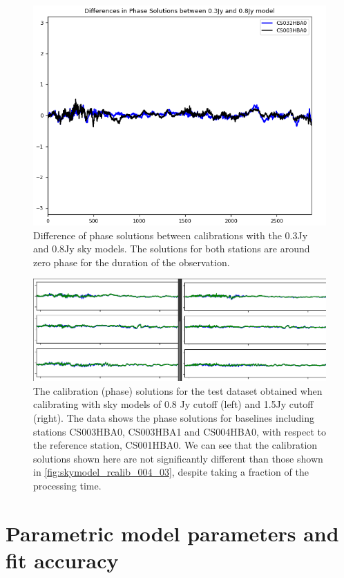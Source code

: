 \begin{figure}
    \includegraphics[width=0.9\linewidth]{figures/diffs.png}
      \caption{Difference of phase solutions between calibrations with the 0.3Jy and 0.8Jy sky models. The solutions for both stations are around zero phase for the duration of the observation.}
	\label{fig:diffs_solutions}
\end{figure}

\begin{figure}
    \includegraphics[width=0.95\linewidth]{figures/08_and_15_solutsions_CS003HBA0_CS003HBA1_CS004HBA0.png}
      \caption{The calibration (phase) solutions for the test dataset obtained when calibrating with sky models of 0.8 Jy cutoff (left) and 1.5Jy cutoff (right). The data shows the phase solutions for baselines including stations CS003HBA0, CS003HBA1 and CS004HBA0, with respect to the reference station, CS001HBA0. We can see that the calibration solutions shown here are not significantly different than those shown in \ref{fig:skymodel_rcalib_004_03}, despite taking a fraction of the processing time.  }
	\label{fig:skymodel_rcalib_08_15}
\end{figure}

\section{Parametric model parameters and fit accuracy}\label{ap:model_params}

